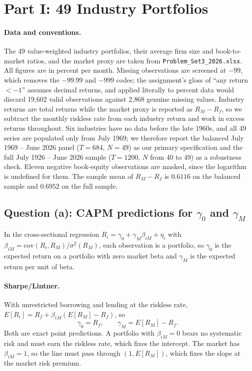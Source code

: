 \section{Part I: 49 Industry Portfolios}

\paragraph{Data and conventions.} The 49 value-weighted industry portfolios,
their average firm size and book-to-market ratios, and the market proxy are
taken from \texttt{Problem\_Set3\_2026.xlsx}. All figures are in percent per
month. Missing observations are screened at $-99$, which removes the $-99.99$
and $-999$ codes; the assignment's gloss of ``any return $<-1$'' assumes
decimal returns, and applied literally to percent data would discard
19{,}602 valid observations against 2{,}868 genuine missing values. Industry
returns are total returns while the market proxy is reported as $R_M - R_f$,
so we subtract the monthly riskless rate from each industry return and work in
excess returns throughout. Six industries have no data before the late 1960s,
and all 49 series are populated only from July 1969; we therefore report the
balanced July 1969 -- June 2026 panel ($T = 684$, $N = 49$) as our primary
specification and the full July 1926 -- June 2026 sample ($T = 1200$, $N$ from
40 to 49) as a robustness check. Eleven negative book-equity observations are
masked, since the logarithm is undefined for them. The sample mean of
$R_M - R_f$ is $0.6116$ on the balanced sample and $0.6952$ on the full sample.

\subsection{Question (a): CAPM predictions for $\gamma_0$ and $\gamma_M$}

In the cross-sectional regression
$R_i = \gamma_0 + \gamma_M \beta_{iM} + \eta_i$ with
$\beta_{iM} = \mathrm{cov}(R_i, R_M)/\sigma^2(R_M)$, each observation is a
portfolio, so $\gamma_0$ is the expected return on a portfolio with zero market
beta and $\gamma_M$ is the expected return per unit of beta.

\paragraph{Sharpe\slash Lintner.} With unrestricted borrowing and lending at
the riskless rate, $E[R_i] = R_f + \beta_{iM}(E[R_M] - R_f)$, so
\[
\gamma_0 = R_f, \qquad \gamma_M = E[R_M] - R_f .
\]
Both are exact point predictions. A portfolio with $\beta_{iM} = 0$ bears no
systematic risk and must earn the riskless rate, which fixes the intercept. The
market has $\beta_{iM} = 1$, so the line must pass through $(1, E[R_M])$, which
fixes the slope at the market risk premium.

